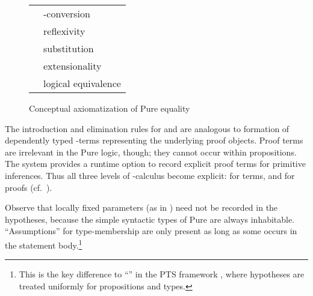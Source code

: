\begin{isabellebody}
\begin{isamarkuptext}
  \begin{figure}[htb]
  \begin{center}
  \begin{tabular}{ll}
  \isa{{\isasymturnstile}\ {\isacharparenleft}{\isasymlambda}x{\isachardot}\ b{\isacharbrackleft}x{\isacharbrackright}{\isacharparenright}\ a\ {\isasymequiv}\ b{\isacharbrackleft}a{\isacharbrackright}} & \isa{{\isasymbeta}}-conversion \\
  \isa{{\isasymturnstile}\ x\ {\isasymequiv}\ x} & reflexivity \\
  \isa{{\isasymturnstile}\ x\ {\isasymequiv}\ y\ {\isasymLongrightarrow}\ P\ x\ {\isasymLongrightarrow}\ P\ y} & substitution \\
  \isa{{\isasymturnstile}\ {\isacharparenleft}{\isasymAnd}x{\isachardot}\ f\ x\ {\isasymequiv}\ g\ x{\isacharparenright}\ {\isasymLongrightarrow}\ f\ {\isasymequiv}\ g} & extensionality \\
  \isa{{\isasymturnstile}\ {\isacharparenleft}A\ {\isasymLongrightarrow}\ B{\isacharparenright}\ {\isasymLongrightarrow}\ {\isacharparenleft}B\ {\isasymLongrightarrow}\ A{\isacharparenright}\ {\isasymLongrightarrow}\ A\ {\isasymequiv}\ B} & logical equivalence \\
  \end{tabular}
  \caption{Conceptual axiomatization of Pure equality}\label{fig:pure-equality}
  \end{center}
  \end{figure}

  The introduction and elimination rules for \isa{{\isasymAnd}} and \isa{{\isasymLongrightarrow}} are analogous to formation of dependently typed \isa{{\isasymlambda}}-terms representing the underlying proof objects.  Proof terms
  are irrelevant in the Pure logic, though; they cannot occur within
  propositions.  The system provides a runtime option to record
  explicit proof terms for primitive inferences.  Thus all three
  levels of \isa{{\isasymlambda}}-calculus become explicit: \isa{{\isasymRightarrow}} for
  terms, and \isa{{\isasymAnd}{\isacharslash}{\isasymLongrightarrow}} for proofs (cf.\
  \cite{Berghofer-Nipkow:2000:TPHOL}).

  Observe that locally fixed parameters (as in ) need
  not be recorded in the hypotheses, because the simple syntactic
  types of Pure are always inhabitable.  ``Assumptions''  for type-membership are only present as long as some  occurs in the statement body.\footnote{This is the key
  difference to ``\isa{{\isasymlambda}HOL}'' in the PTS framework
  \cite{Barendregt-Geuvers:2001}, where hypotheses  are
  treated uniformly for propositions and types.}


\end{isamarkuptext}
\end{isabellebody}
